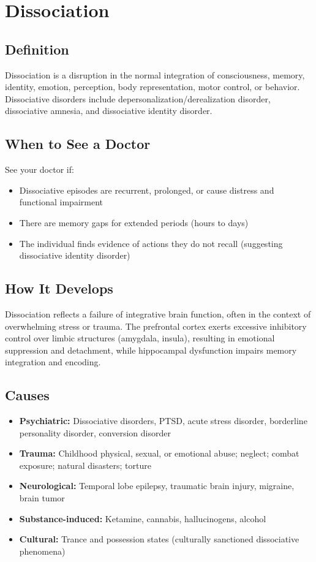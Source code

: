 \chapter{Dissociation}

\section*{Definition}
Dissociation is a disruption in the normal integration of consciousness, memory, identity, emotion, perception, body representation, motor control, or behavior. Dissociative disorders include depersonalization/derealization disorder, dissociative amnesia, and dissociative identity disorder.

\section*{When to See a Doctor}
See your doctor if:
\begin{itemize}
  \item Dissociative episodes are recurrent, prolonged, or cause distress and functional impairment
  \item There are memory gaps for extended periods (hours to days)
  \item The individual finds evidence of actions they do not recall (suggesting dissociative identity disorder)
\end{itemize}

\section*{How It Develops}
Dissociation reflects a failure of integrative brain function, often in the context of overwhelming stress or trauma. The prefrontal cortex exerts excessive inhibitory control over limbic structures (amygdala, insula), resulting in emotional suppression and detachment, while hippocampal dysfunction impairs memory integration and encoding.

\section*{Causes}
\begin{itemize}
  \item \textbf{Psychiatric:} Dissociative disorders, PTSD, acute stress disorder, borderline personality disorder, conversion disorder
  \item \textbf{Trauma:} Childhood physical, sexual, or emotional abuse; neglect; combat exposure; natural disasters; torture
  \item \textbf{Neurological:} Temporal lobe epilepsy, traumatic brain injury, migraine, brain tumor
  \item \textbf{Substance-induced:} Ketamine, cannabis, hallucinogens, alcohol
  \item \textbf{Cultural:} Trance and possession states (culturally sanctioned dissociative phenomena)
\end{itemize}

